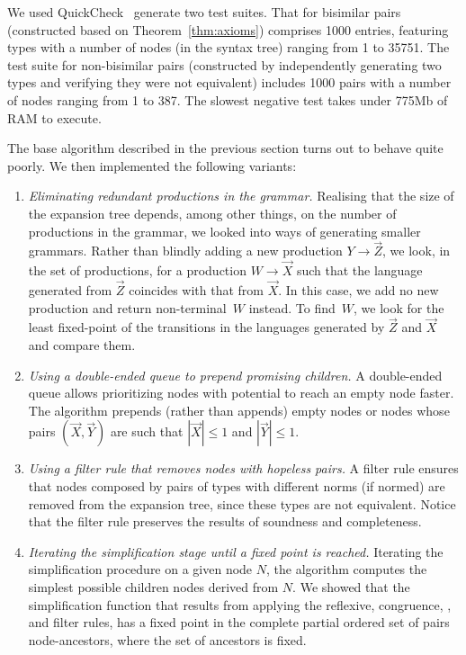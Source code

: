We used QuickCheck~\cite{DBLP:conf/icfp/ClaessenH00} generate two test
suites. That for bisimilar pairs (constructed based on
Theorem~\ref{thm:axioms}) comprises 1000 entries, featuring types with
a number of nodes (in the syntax tree) ranging from 1 to 35751. The
test suite for non-bisimilar pairs (constructed by independently
generating two types and verifying they were not equivalent) includes
1000 pairs with a number of nodes ranging from 1 to 387.
%
The slowest negative test takes under 775Mb of RAM to execute.

The base algorithm described in the previous section turns out to
behave quite poorly. We then implemented the
following variants:
%
\begin{enumerate}
\item \emph{Eliminating redundant productions in the grammar.}
  Realising that the size of the expansion tree depends, among other
  things, on the number of productions in the grammar, we looked into
  ways of generating smaller grammars. Rather than blindly adding a
  new production $Y \rightarrow \vec Z$, we look, in the set of
  productions, for a production $W \rightarrow \vec X$ such that the
  language generated from $\vec Z$ coincides with that from $\vec
  X$. In this case, we add no new production and return
  non-terminal~$W$ instead. To find~$W$, we look for the least
  fixed-point of the transitions in the languages generated by
  $\vec Z$ and $\vec X$ and compare them.
  \item
  \emph{ Using a double-ended queue to prepend promising children.} A
  double-ended queue allows prioritizing nodes with potential to reach
  an empty node faster.  The algorithm prepends (rather than appends)
  empty nodes or nodes whose pairs $(\vec X, \vec Y)$ are such that
  $|\vec X|\leq 1$ and $|\vec Y| \leq 1$.
  \item
  \emph{Using a filter rule that removes nodes with hopeless pairs.} A
  filter rule ensures that nodes composed by pairs of types with
  different norms (if normed) are removed from the expansion tree,
  since these types are not equivalent.  Notice that the filter rule
  preserves the results of soundness and completeness.
  \item
  \emph{Iterating the simplification stage until a fixed point is
    reached.} Iterating the simplification procedure on a given node
  $N$, the algorithm computes the simplest possible children nodes
  derived from $N$. We showed that the simplification function that
  results from applying the reflexive, congruence, \BPA, and filter
  rules, has a fixed point in the complete partial ordered set of
  pairs node-ancestors, where the set of ancestors is fixed.
\end{enumerate}

